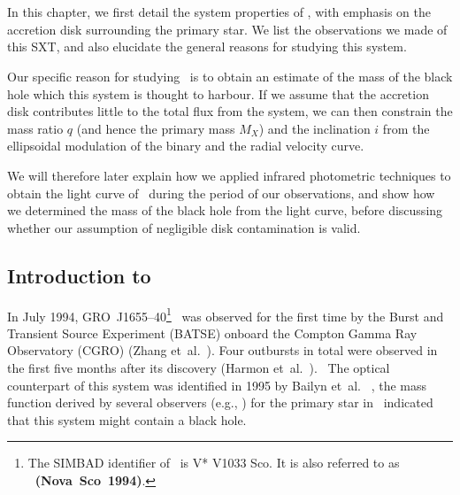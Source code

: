 \chapter{\groj}
\label{cha:GROJ1655-40}

In this chapter, we first detail the system properties of \groj, with
emphasis on the accretion disk surrounding the primary star. We list
the observations we made of this SXT, and also elucidate the general reasons for studying this
system. %

\vspace{\myparskip}

Our specific reason for studying \groj\ is to obtain an estimate of
the mass of the black hole which this system is thought to harbour. If
we assume that the accretion disk contributes little to the total flux
from the system, we can then constrain the mass ratio $q$ (and hence the primary mass $M_{X}$) and the inclination $i$  from the ellipsoidal modulation of the binary and the radial velocity curve. %

\vspace{\myparskip}

We will therefore later explain how we applied infrared photometric techniques to obtain the light curve of \groj\ during the period of our observations, and show how we determined the mass of the black hole from the light curve, before discussing whether our assumption of negligible disk
contamination is valid.


\section{Introduction to \groj}
\label{cha:GROJ1655-40:sec:IntroductionToJ1655}

In July 1994, \mbox{GRO J1655--40}\footnote{%
\label{cha:GROJ1655-40:sec:IntroductionToJ1655:foot:SIMBAD}
The SIMBAD identifier of \groj\ is V* V1033 Sco. It is also
referred to as \textbf{\nova\ (\mbox{Nova Sco 1994})}.%
}%
\ was observed for the first time by the Burst and
Transient Source Experiment (BATSE) onboard the Compton Gamma Ray
Observatory (CGRO) (Zhang et~al.\ ). %
Four outbursts in total were observed in the first five months after
its discovery (Harmon et~al.\ ).%
\ The optical counterpart of this system was identified in 1995 by
Bailyn et~al.\ \citeyear{BailynOroszGirad_et_al.:1995}%
, the mass function derived by several observers (e.g.,
) for the primary star in \groj\ indicated
that this system might contain a black hole. %

